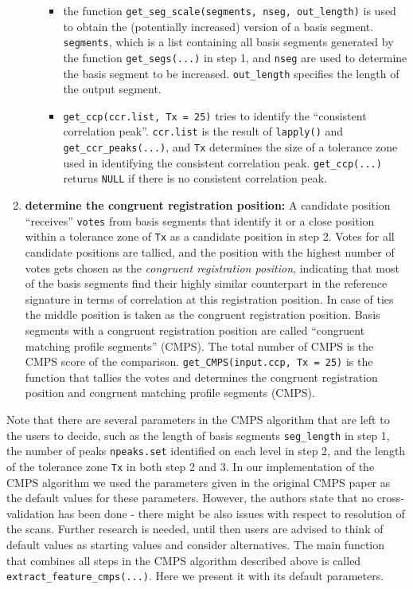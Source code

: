 \begin{enumerate}
\begin{itemize}
    \begin{itemize}
    \tightlist
    \item
      the function
      \texttt{get\_seg\_scale(segments,\ nseg,\ out\_length)} is used to
      obtain the (potentially increased) version of a basis segment.
      \texttt{segments}, which is a list containing all basis segments
      generated by the function \texttt{get\_segs(...)} in step 1, and
      \texttt{nseg} are used to determine the basis segment to be
      increased. \texttt{out\_length} specifies the length of the output
      segment.
    \item
      \texttt{get\_ccp(ccr.list,\ Tx\ =\ 25)} tries to identify the
      ``consistent correlation peak''. \texttt{ccr.list} is the result
      of \texttt{lapply()} and \texttt{get\_ccr\_peaks(...)}, and
      \texttt{Tx} determines the size of a tolerance zone used in
      identifying the consistent correlation peak.
      \texttt{get\_ccp(...)} returns \texttt{NULL} if there is no
      consistent correlation peak.
    \end{itemize}
  \end{itemize}
\item
  \textbf{determine the congruent registration position:} A candidate
  position ``receives'' \texttt{votes} from basis segments that identify
  it or a close position within a tolerance zone of \texttt{Tx} as a
  candidate position in step 2. Votes for all candidate positions are
  tallied, and the position with the highest number of votes gets chosen
  as the \emph{congruent registration position}, indicating that most of
  the basis segments find their highly similar counterpart in the
  reference signature in terms of correlation at this registration
  position. In case of ties the middle position is taken as the
  congruent registration position. Basis segments with a congruent
  registration position are called ``congruent matching profile
  segments'' (CMPS). The total number of CMPS is the CMPS score of the
  comparison. \texttt{get\_CMPS(input.ccp,\ Tx\ =\ 25)} is the function
  that tallies the votes and determines the congruent registration
  position and congruent matching profile segments (CMPS).
\end{enumerate}

Note that there are several parameters in the CMPS algorithm that are
left to the users to decide, such as the length of basis segments
\texttt{seg\_length} in step 1, the number of peaks \texttt{npeaks.set}
identified on each level in step 2, and the length of the tolerance zone
\texttt{Tx} in both step 2 and 3. In our implementation of the CMPS
algorithm we used the parameters given in the original CMPS paper
\citep{cmps} as the default values for these parameters. However, the
authors state that no cross-validation has been done - there might be
also issues with respect to resolution of the scans. Further research is
needed, until then users are advised to think of default values as
starting values and consider alternatives. The main function that
combines all steps in the CMPS algorithm described above is called
\texttt{extract\_feature\_cmps(...)}. Here we present it with its
default parameters.

